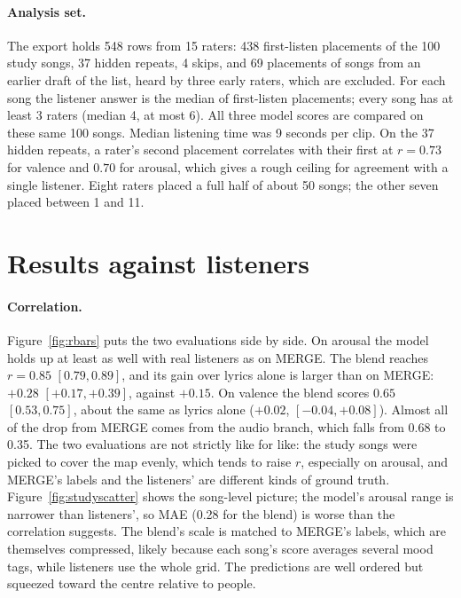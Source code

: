 \documentclass[10pt,twocolumn]{article}
\begin{document}
\paragraph{Analysis set.} The export holds 548 rows from 15 raters: 438 first-listen placements of the 100 study songs, 37 hidden repeats, 4 skips, and 69 placements of songs from an earlier draft of the list, heard by three early raters, which are excluded. For each song the listener answer is the median of first-listen placements; every song has at least 3 raters (median 4, at most 6). All three model scores are compared on these same 100 songs. Median listening time was 9 seconds per clip. On the 37 hidden repeats, a rater's second placement correlates with their first at $r=0.73$ for valence and $0.70$ for arousal, which gives a rough ceiling for agreement with a single listener. Eight raters placed a full half of about 50 songs; the other seven placed between 1 and 11.

\section{Results against listeners}
\label{sec:listeners}


\paragraph{Correlation.} Figure~\ref{fig:rbars} puts the two evaluations side by side. On arousal the model holds up at least as well with real listeners as on MERGE. The blend reaches $r=0.85$ $[0.79,0.89]$, and its gain over lyrics alone is larger than on MERGE: $+0.28$ $[+0.17,+0.39]$, against $+0.15$. On valence the blend scores $0.65$ $[0.53,0.75]$, about the same as lyrics alone ($+0.02$, $[-0.04,+0.08]$). Almost all of the drop from MERGE comes from the audio branch, which falls from 0.68 to 0.35. The two evaluations are not strictly like for like: the study songs were picked to cover the map evenly, which tends to raise $r$, especially on arousal, and MERGE's labels and the listeners' are different kinds of ground truth. Figure~\ref{fig:studyscatter} shows the song-level picture; the model's arousal range is narrower than listeners', so MAE (0.28 for the blend) is worse than the correlation suggests. The blend's scale is matched to MERGE's labels, which are themselves compressed, likely because each song's score averages several mood tags, while listeners use the whole grid. The predictions are well ordered but squeezed toward the centre relative to people.
\end{document}

